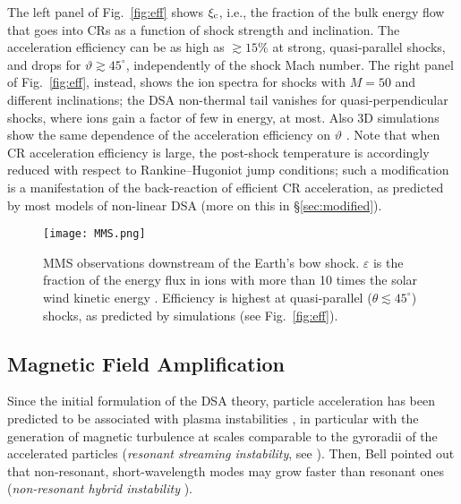\documentclass[varenna]{cimento}
\newcommand\thbn{\vartheta}
\renewcommand{\deg}{^{\circ}}
\newcommand{\xcr}{\xi_{\rm c}}
\begin{document}
The left panel of Fig.~\ref{fig:eff} shows $\xcr$, i.e., the fraction of the bulk energy flow that goes into CRs as a function of shock strength and inclination. 
The acceleration efficiency can be as high as $\gtrsim 15\%$ at strong, quasi-parallel shocks, and drops for $\thbn\gtrsim 45\deg$, independently of the shock Mach number. 
The right panel of Fig.~\ref{fig:eff}, instead, shows the ion spectra for shocks with $M=50$ and different inclinations;
the DSA non-thermal tail vanishes for quasi-perpendicular shocks, where ions gain a factor of few in energy, at most.
Also 3D simulations show the same dependence of the acceleration efficiency on $\thbn$ \cite{caprioli+14a}.
Note that when CR acceleration efficiency is large, the post-shock temperature is accordingly reduced with respect to Rankine--Hugoniot jump conditions;
such a modification is a manifestation of the back-reaction of efficient CR acceleration, as predicted by most models of non-linear DSA (more on this in \S\ref{sec:modified}).

\begin{figure}[t]
\centering
\texttt{[image: MMS.png]}
\caption{\label{fig:theta}
MMS observations downstream of the Earth's bow shock. $\varepsilon$ is the fraction of the energy flux in ions with more than 10 times the solar wind kinetic energy \cite{johlander+21}.
Efficiency is highest at quasi-parallel ($\theta\lesssim45\deg$) shocks, as predicted by simulations (see Fig.~\ref{fig:eff}).}
\end{figure}

 
\subsection{\label{sec:MFA} Magnetic Field Amplification}
Since the initial formulation of the DSA theory, particle acceleration has been predicted to be associated with plasma instabilities \cite{bell78a}, in particular with the generation of magnetic turbulence at scales comparable to the gyroradii of the accelerated particles (\emph{resonant streaming instability}, see \cite{skilling75a,bell78a}). 
Then, Bell pointed out that non-resonant, short-wavelength modes may grow faster than resonant ones (\emph{non-resonant hybrid instability} \cite{bell04}). 
\end{document}
